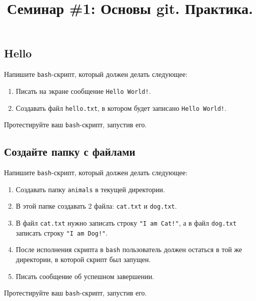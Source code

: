 \documentclass{article}
\begin{document}
\title{Семинар \#1: Основы git. Практика. \vspace{-5ex}}\date{}\maketitle

\subsection{Hello}
Напишите \texttt{bash}-скрипт, который должен делать следующее:
\begin{enumerate}
\item Писать на экране сообщение \texttt{Hello World!}.
\item Создавать файл \texttt{hello.txt}, в котором будет записано \texttt{Hello World!}.
\end{enumerate}
Протестируйте ваш \texttt{bash}-скрипт, запустив его.


\subsection{Создайте папку с файлами}
Напишите \texttt{bash}-скрипт, который должен делать следующее:
\begin{enumerate}
\item Создавать папку \texttt{animals} в текущей директории.
\item В этой папке создавать 2 файла: \texttt{cat.txt} и \texttt{dog.txt}.
\item В файл \texttt{cat.txt} нужно записать строку \texttt{"I am Cat!"}, а в файл \texttt{dog.txt} записать строку \texttt{"I am Dog!"}.
\item После исполнения скрипта в \texttt{bash} пользователь должен остаться в той же директории, в которой скрипт был запущен.
\item Писать сообщение об успешном завершении.
\end{enumerate}
Протестируйте ваш \texttt{bash}-скрипт, запустив его.
\end{document}
